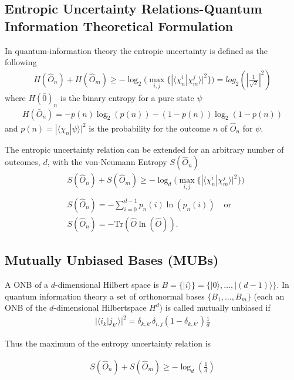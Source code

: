 \documentclass[a4paper]{article}
\begin{document}
\subsection{Entropic Uncertainty Relations-Quantum Information Theoretical
Formulation}
In quantum-information theory the entropic uncertainty is defined as the
following
\begin{align}
    H(\hat{O}_n) + H(\hat{O}_m) \geq - \log_2\bigg(\max_{i,j}\{|\langle
    \chi_n^i|\chi_m^j \rangle|^2\} \bigg) = log_2(|\frac{1}{\sqrt{2}}|^2)
\end{align}
where $H(\bar{0})_n$ is the binary entropy for a pure state $\psi$
\begin{align}
    H(\bar{O}_n) = -p(n)\log_2(p(n)) -(1-p(n))\log_2(1-p(n))
\end{align}
and $p(n) = |\langle \chi_n | \psi \rangle|^2$ is the probability for the
outcome $n$ of $\hat{O}_n$ for $\psi$.

The entropic uncertainty relation can be extended for an arbitrary number of
outcomes, $d$, with the von-Neumann Entropy $S(\hat{O}_n)$
\begin{align}
    &S(\hat{O}_n) + S(\hat{O}_m) \geq - \log_d\bigg(\max_{i,j}\{|\langle
    \chi_n^i|\chi_m^j \rangle|^2\} \bigg)\\
    \nonumber\\
    &S(\hat{O}_n) = -\sum^{d-1}_{i=0} p_n(i)\ln(p_n(i)) \;\;\;\ \text{or}\\
    &S(\hat{O}_n) = -\text{Tr}(\hat{O} \ln(\hat{O})). \label{eq:vn}
\end{align}

\subsection{Mutually Unbiased Bases (MUBs)}
A ONB of a $d$-dimensional Hilbert space is $B = \{|i \rangle\} = \{|0\rangle ,\dots,
|(d-1)\rangle \}$. In quantum information theory a set of orthonormal bases
$\{B_1, \dots, B_m\}$ (each an ONB of the $d$-dimensional Hilbertspace $H^d$) is called mutually
unbiased if
\begin{align}
    |\langle i_k| j_{k'}\rangle|^2 = \delta_{k,k'}\delta_{i,j}
    (1-\delta_{k,k'})\frac{1}{d}
\end{align}

Thus the maximum of the entropy uncertainty relation is

\begin{align}
    S(\hat{O}_n) + S(\hat{O}_m) \geq - \log_d(\frac{1}{d})
\end{align}
\end{document}

